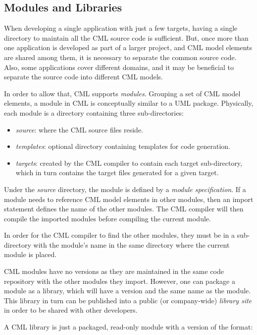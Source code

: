 \subsection{Modules and Libraries}\label{subsec:modlib}

When developing a single application with just a few targets, having a single directory to maintain all the CML source code is sufficient. But, once more than one application is developed as part of a larger project, and CML model elements are shared among them, it is necessary to separate the common source code. Also, some applications cover different domains, and it may be beneficial to separate the source code into different CML models.

In order to allow that, CML supports \emph{modules}. Grouping a set of CML model elements, a module in CML is conceptually similar to a UML \cite{uml} package. Physically, each module is a directory containing three sub-directories:

\begin{itemize}
\item \emph{source}: where the CML source files reside.
\item \emph{templates}: optional directory containing templates for code generation.
\item \emph{targets}: created by the CML compiler to contain each target sub-directory, which in turn contains the target files generated for a given target.
\end{itemize}

Under the \emph{source} directory, the module is defined by a \emph{module specification}. If a module needs to reference CML model elements in other modules, then an import statement defines the name of the other modules. The CML compiler will then compile the imported modules before compiling the current module.

In order for the CML compiler to find the other modules, they must be in a sub-directory with the module's name in the same directory where the current module is placed.

CML modules have no versions as they are maintained in the same code repository with the other modules they import. However, one can package a module as a library, which will have a version and the same name as the module. This library in turn can be published into a public (or company-wide) \emph{library site} in order to be shared with other developers.

A CML library is just a packaged, read-only module with a version of the format: 

